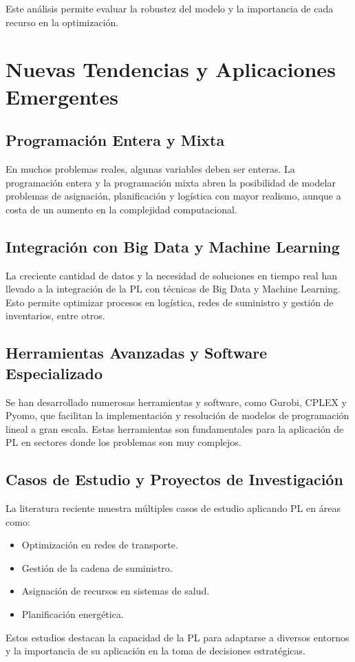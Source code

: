 	Este análisis permite evaluar la robustez del modelo y la importancia de cada recurso en la optimización.

	\section{Nuevas Tendencias y Aplicaciones Emergentes}
	
	\subsection{Programación Entera y Mixta}
	En muchos problemas reales, algunas variables deben ser enteras. La programación entera y la programación mixta abren la posibilidad de modelar problemas de asignación, planificación y logística con mayor realismo, aunque a costa de un aumento en la complejidad computacional.
	
	\subsection{Integración con Big Data y Machine Learning}
	La creciente cantidad de datos y la necesidad de soluciones en tiempo real han llevado a la integración de la PL con técnicas de Big Data y Machine Learning. Esto permite optimizar procesos en logística, redes de suministro y gestión de inventarios, entre otros.
	
	\subsection{Herramientas Avanzadas y Software Especializado}
	Se han desarrollado numerosas herramientas y software, como Gurobi, CPLEX y Pyomo, que facilitan la implementación y resolución de modelos de programación lineal a gran escala. Estas herramientas son fundamentales para la aplicación de PL en sectores donde los problemas son muy complejos.
	
	\subsection{Casos de Estudio y Proyectos de Investigación}
	La literatura reciente muestra múltiples casos de estudio aplicando PL en áreas como:
	\begin{itemize}[noitemsep]
		\item Optimización en redes de transporte.
		\item Gestión de la cadena de suministro.
		\item Asignación de recursos en sistemas de salud.
		\item Planificación energética.
	\end{itemize}
	Estos estudios destacan la capacidad de la PL para adaptarse a diversos entornos y la importancia de su aplicación en la toma de decisiones estratégicas.
	
